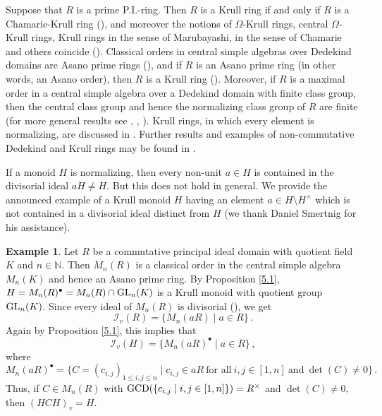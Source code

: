 \documentclass[a4paper]{amsart}
\theoremstyle{definition}
\newtheorem{example}[theorem]{Example}
\numberwithin{equation}{section}
\begin{document}
\smallskip
Suppose that  $R$ is a prime P.I.-ring. Then $R$ is a Krull ring
if and only if $R$ is a Chamarie-Krull ring (\cite[Proposition
3.5]{Wa84a}), and moreover the notions of $\Omega$-Krull rings,
central $\Omega$-Krull rings, Krull rings in the sense of
Marubayashi, in the sense of Chamarie and others coincide
(\cite[Theorem 2.4]{Je86a}). Classical orders in central simple
algebras over Dedekind domains are Asano prime rings (\cite[Theorem
5.3.16]{Mc-Ro01a}), and if $R$ is an Asano prime ring (in other
words, an Asano order), then $R$ is a Krull ring
(\cite[Proposition 5.2.6]{Mc-Ro01a}).
Moreover, if $R$ is a maximal order in a central simple algebra over a Dedekind domain with finite class group, then the central class group and hence the normalizing class group of $R$ are finite
(for more general results see \cite[Corollary 37.32]{R03}, \cite[Proposition 8.1]{Je86a}, \cite[Chapter E, Proposition 2.3]{Va-Ve84}). Krull rings, in which every element is normalizing, are discussed in \cite{Le-Oy86, Wa-Je86a}.
Further results and examples of
non-commutative Dedekind and Krull rings may be found in \cite{Ak-Bu11a, Wa-Je86a}.

\smallskip
If a monoid $H$ is normalizing, then every non-unit $a \in H$ is
contained in the divisorial ideal $aH \ne H$. But this does not hold
in general.  We provide the announced example of a Krull monoid $H$
having an element $a \in H \setminus H^{\times}$ which is not
contained in a divisorial ideal distinct from $H$ (we thank Daniel
Smertnig for his assistance).

\medskip
\begin{example} \label{5.2}
Let $R$ be a commutative principal ideal domain with quotient field $K$ and $n \in \mathbb N$. Then $M_n (R)$ is a classical order in the central simple algebra $M_n (K)$ and hence an Asano prime ring. By Proposition \ref{5.1}, $H = M_n (R)^{\bullet} = M_n (R) \cap \text{\rm GL}_n (K)$ is a Krull monoid with quotient group $\text{\rm GL}_n (K)$. Since every ideal of $M_n (R)$ is divisorial (\cite[Proposition 5.2.6]{Mc-Ro01a}),  we get
\[
\mathcal I_v (R) = \{ M_n (aR) \mid a \in R \} \,.
\]
Again by Proposition \ref{5.1}, this implies that
\[
\mathcal I_v (H) = \{ M_n (aR)^{\bullet} \mid a \in R \} \,,
\]
where
\[
M_n (aR)^{\bullet} = \{ C = (c_{i,j})_{1 \le i,j \le n} \mid c_{i,j} \in aR \ \text{for all} \ i, j \in [1,n] \ \text{and} \ \det (C) \ne 0 \} \,.
\]
Thus, if $C \in M_n (R)$ with $\text{\rm GCD} (\{c_{i,j} \mid i, j \in [1,n] \}) = R^{\times}$ and $\det (C) \ne 0$, then $(HCH)_v = H$.
\end{example}
\end{document}
